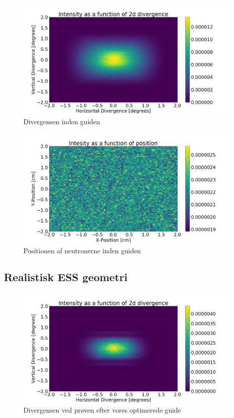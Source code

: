 \documentclass[12pt,oneside,a4paper]{article}
\begin{document}
{{{{{\begin{figure}[H]
\centering
\includegraphics[width=1\textwidth]{div_ess_simple_before.png}
\caption{Divergensen inden guiden}
\end{figure}

\begin{figure}[H]
\centering
\includegraphics[width=1\textwidth]{psd_ess_simple_before.png}
\caption{Positionen af neutronerne inden guiden}
\end{figure}



\subsection{Realistisk ESS geometri}

\begin{figure}[H]
\centering
\includegraphics[width=1\textwidth]{div_after_ess_brill_optimized.png}
\caption{Divergensen ved prøven efter vores optimerede guide}
\end{figure}

}}}}}
\end{document}
